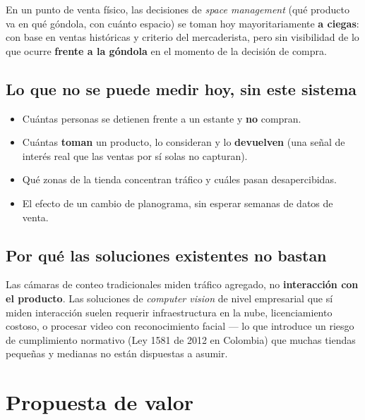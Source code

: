\documentclass[11pt,a4paper]{report}
\begin{document}
En un punto de venta físico, las decisiones de \textit{space management} (qué producto va en qué
góndola, con cuánto espacio) se toman hoy mayoritariamente \textbf{a ciegas}: con base en ventas
históricas y criterio del mercaderista, pero sin visibilidad de lo que ocurre \textbf{frente a la
góndola} en el momento de la decisión de compra.

\section{Lo que no se puede medir hoy, sin este sistema}

\begin{itemize}
  \item Cuántas personas se detienen frente a un estante y \textbf{no} compran.
  \item Cuántas \textbf{toman} un producto, lo consideran y lo \textbf{devuelven} (una señal de
    interés real que las ventas por sí solas no capturan).
  \item Qué zonas de la tienda concentran tráfico y cuáles pasan desapercibidas.
  \item El efecto de un cambio de planograma, sin esperar semanas de datos de venta.
\end{itemize}

\section{Por qué las soluciones existentes no bastan}

Las cámaras de conteo tradicionales miden tráfico agregado, no \textbf{interacción con el
producto}. Las soluciones de \textit{computer vision} de nivel empresarial que sí miden
interacción suelen requerir infraestructura en la nube, licenciamiento costoso, o procesar video
con reconocimiento facial --- lo que introduce un riesgo de cumplimiento normativo
(Ley 1581 de 2012 en Colombia) que muchas tiendas pequeñas y medianas no están dispuestas a asumir.

\chapter{Propuesta de valor}
\end{document}
